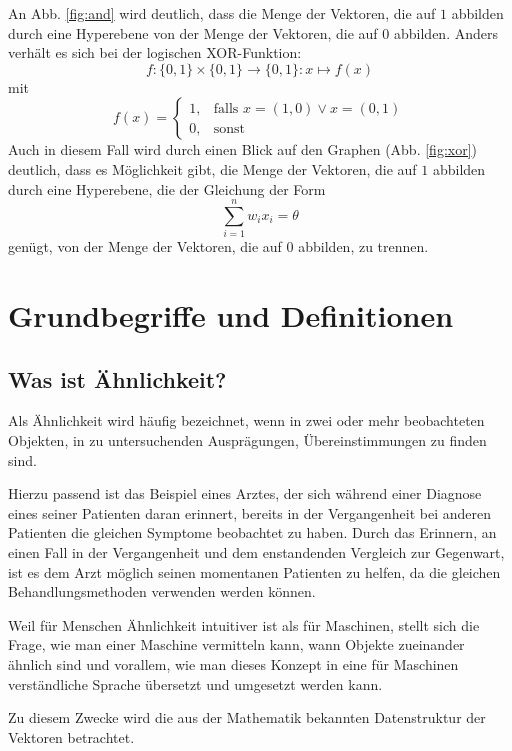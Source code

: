 \documentclass[fontsize=11pt]{scrartcl}
\begin{document}
                        An Abb. \ref{fig:and} wird deutlich, dass die Menge der Vektoren, die auf $1$ abbilden durch eine Hyperebene von der Menge der Vektoren, die auf $0$ abbilden.
                        \newline
                        Anders verhält es sich bei der logischen XOR-Funktion:
                        $$
                            f:\{0,1\}\times\{0,1\}\rightarrow\{0,1\}: x\mapsto f(x)
                        $$
                        mit
                        $$
                            f(x)=\left\{\begin{array}{cl} 1, & \mbox{falls }x=(1,0) \vee x = (0,1)\\
                            0, & \mbox{sonst}\end{array}\right. 
                        $$
                        Auch in diesem Fall wird durch einen Blick auf den Graphen (Abb. \ref{fig:xor}) deutlich, dass es Möglichkeit gibt, die Menge der Vektoren, die auf $1$ abbilden durch eine Hyperebene, die der Gleichung der Form
                        $$
                            \sum_{i=1}^nw_ix_i = \theta
                        $$
                        genügt, von der Menge der Vektoren, die auf $0$ abbilden, zu trennen\cite{ertel2016}.

                        
        \section{Grundbegriffe und Definitionen}
            \subsection{Was ist Ähnlichkeit?}
                Als Ähnlichkeit wird häufig bezeichnet, wenn in zwei oder mehr beobachteten Objekten, in zu untersuchenden Ausprägungen, Übereinstimmungen zu finden sind.\par
                Hierzu passend ist das Beispiel eines Arztes, der sich während einer Diagnose eines seiner Patienten daran erinnert, bereits in der Vergangenheit bei anderen Patienten die gleichen Symptome beobachtet zu haben.\cite{ertel2016} Durch das Erinnern, an einen Fall in der Vergangenheit und dem enstandenden Vergleich zur Gegenwart, ist es dem Arzt möglich seinen momentanen Patienten zu helfen, da die gleichen Behandlungsmethoden verwenden werden können.\par
                Weil für Menschen Ähnlichkeit intuitiver ist als für Maschinen, stellt sich die Frage, wie man einer Maschine vermitteln kann, wann Objekte zueinander ähnlich sind und vorallem, wie man dieses Konzept in eine für Maschinen verständliche Sprache übersetzt und umgesetzt werden kann.\par
                Zu diesem Zwecke wird die aus der Mathematik bekannten Datenstruktur der Vektoren betrachtet.
\end{document}
